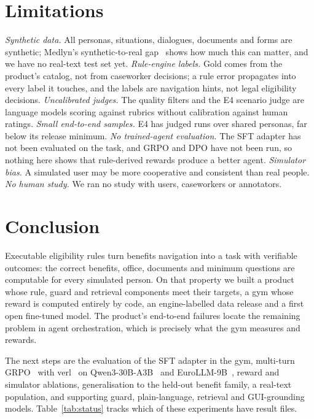 \documentclass[10pt]{article}
\makeatletter
\renewcommand\paragraph{\@startsection{paragraph}{4}{\z@}{0.35em}{-0.8em}{\normalfont\normalsize\bfseries}}
\makeatother
\begin{document}
\section{Limitations}
\label{sec:limitations}

\emph{Synthetic data.} All personas, situations, dialogues, documents and forms are synthetic;
Medlyn's synthetic-to-real gap~\citep{medlyn} shows how much this can matter, and we have no
real-text test set yet. \emph{Rule-engine labels.} Gold comes from the product's catalog, not from
caseworker decisions; a rule error propagates into every label it touches, and the labels are
navigation hints, not legal eligibility decisions. \emph{Uncalibrated judges.} The quality filters
and the E4 scenario judge are language models scoring against rubrics without calibration against
human ratings. \emph{Small end-to-end samples.} E4 has \EvalEFourJudged{} judged runs over shared
personas, far below its release minimum. \emph{No trained-agent evaluation.} The SFT adapter has
not been evaluated on the task, and GRPO and DPO have not been run, so nothing here shows that
rule-derived rewards produce a better agent. \emph{Simulator bias.} A simulated user may be more
cooperative and consistent than real people. \emph{No human study.} We ran no study with users,
caseworkers or annotators.

\section{Conclusion}
\label{sec:conclusion}

Executable eligibility rules turn benefits navigation into a task with verifiable outcomes: the
correct benefits, office, documents and minimum questions are computable for every simulated person.
On that property we built a product whose rule, guard and retrieval components meet their targets,
a gym whose reward is computed entirely by code, an engine-labelled data release and a first open
fine-tuned model. The product's end-to-end failures locate the remaining problem in agent
orchestration, which is precisely what the gym measures and rewards.

\paragraph{Future work.}
\label{sec:future}
The next steps are the evaluation of the SFT adapter in the gym, multi-turn
GRPO~\citep{shao2024deepseekmath} with verl~\citep{sheng2024hybridflow} on
Qwen3-30B-A3B~\citep{qwen3-30b-a3b} and EuroLLM-9B~\citep{eurollm-9b}, reward and simulator
ablations, generalisation to the held-out benefit family, a real-text population, and supporting
guard, plain-language, retrieval and GUI-grounding models. Table~\ref{tab:status} tracks which of
these experiments have result files.
\end{document}
